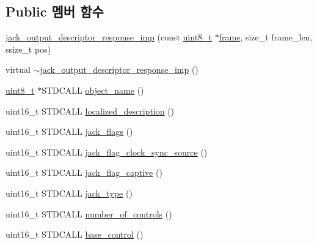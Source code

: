\subsection*{Public 멤버 함수}
\begin{DoxyCompactItemize}
\item 
\hyperlink{classavdecc__lib_1_1jack__output__descriptor__response__imp_a040db331546704426de8bff64c17aeb2}{jack\+\_\+output\+\_\+descriptor\+\_\+response\+\_\+imp} (const \hyperlink{stdint_8h_aba7bc1797add20fe3efdf37ced1182c5}{uint8\+\_\+t} $\ast$\hyperlink{gst__avb__playbin_8c_ac8e710e0b5e994c0545d75d69868c6f0}{frame}, size\+\_\+t frame\+\_\+len, ssize\+\_\+t pos)
\item 
virtual \hyperlink{classavdecc__lib_1_1jack__output__descriptor__response__imp_a746db7966e847996ee903e44b4feb3ec}{$\sim$jack\+\_\+output\+\_\+descriptor\+\_\+response\+\_\+imp} ()
\item 
\hyperlink{stdint_8h_aba7bc1797add20fe3efdf37ced1182c5}{uint8\+\_\+t} $\ast$S\+T\+D\+C\+A\+LL \hyperlink{classavdecc__lib_1_1jack__output__descriptor__response__imp_a15837e3eb254ad44812cb766ae8cd53c}{object\+\_\+name} ()
\item 
uint16\+\_\+t S\+T\+D\+C\+A\+LL \hyperlink{classavdecc__lib_1_1jack__output__descriptor__response__imp_aa94307532fbb37e2f986fee8fec79373}{localized\+\_\+description} ()
\item 
uint16\+\_\+t S\+T\+D\+C\+A\+LL \hyperlink{classavdecc__lib_1_1jack__output__descriptor__response__imp_a948ec24f1eab1560f4b8d7a3cc284437}{jack\+\_\+flags} ()
\item 
uint16\+\_\+t S\+T\+D\+C\+A\+LL \hyperlink{classavdecc__lib_1_1jack__output__descriptor__response__imp_a93b4deb895be2840af94e63d9db174a0}{jack\+\_\+flag\+\_\+clock\+\_\+sync\+\_\+source} ()
\item 
uint16\+\_\+t S\+T\+D\+C\+A\+LL \hyperlink{classavdecc__lib_1_1jack__output__descriptor__response__imp_a8e8d981d8b9f1012c0a2f34e4208ecef}{jack\+\_\+flag\+\_\+captive} ()
\item 
uint16\+\_\+t S\+T\+D\+C\+A\+LL \hyperlink{classavdecc__lib_1_1jack__output__descriptor__response__imp_a4950216cf18021c8010f4691b0b67d45}{jack\+\_\+type} ()
\item 
uint16\+\_\+t S\+T\+D\+C\+A\+LL \hyperlink{classavdecc__lib_1_1jack__output__descriptor__response__imp_abdf54b1d2b03f5f2b7346ddc9d93df5c}{number\+\_\+of\+\_\+controls} ()
\item 
uint16\+\_\+t S\+T\+D\+C\+A\+LL \hyperlink{classavdecc__lib_1_1jack__output__descriptor__response__imp_a81a06cae8ad2431f6a3e067cc210aa98}{base\+\_\+control} ()
\end{DoxyCompactItemize}
